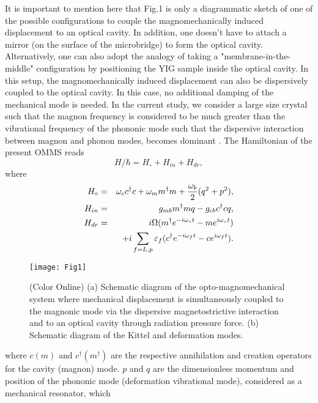 \documentclass[aps,pra,superscriptaddress,balancelastpage,twocolumn]{revtex4}
\begin{document}
It is important to mention here that Fig.1 is only a diagrammatic sketch of one of the possible
configurations to couple the magnomechanically induced displacement to an optical cavity. In addition, one doesn't have to attach a mirror (on the surface of the microbridge) to form the optical cavity. Alternatively, one can also adopt the analogy of taking a "membrane-in-the-middle" configuration by positioning the YIG sample inside the optical cavity. In this setup, the  magnomechanically induced displacement can also be dispersively coupled to the optical cavity. In this case, no additional damping of the mechanical mode is needed. In the current study, we consider a large size crystal such that the magnon frequency is considered to be much greater than the vibrational frequency of the phononic mode such that the dispersive interaction between magnon and phonon modes, becomes dominant \cite{Tang,Ballestero}. The Hamiltonian of the present OMMS reads
\begin{equation}
H/\hbar =H_{\circ }+H_{in}+H_{dr},
\end{equation}%
where
\begin{eqnarray}
H_{\circ } &=&\omega _{c}c^{\dagger }c+\omega _{m}m^{\dagger }m+\frac{\omega
_{b}}{2}(q^{2}+p^{2}), \\
H_{in} &=&g_{mb}m^{\dagger }mq-g_{cb}c^{\dagger }cq,  \label{Hi} \\
H_{dr} &=&i\Omega (m^{\dagger }e^{-i\omega _{\circ }t}-me^{i\omega _{\circ
}t})  \notag \\
&&+i\sum_{f=L,p} \varepsilon _{f}(c^{\dagger }e^{-i\omega _{f}t}-ce^{i\omega
_{f}t}) .
\end{eqnarray}%
\begin{figure}[b!]
\par
\begin{center}
\texttt{[image: Fig1]}
\end{center}
\caption{(Color Online) (a) Schematic diagram of the opto-magnomechanical
system where mechanical displacement is simultaneously coupled to the
magnonic mode via the dispersive magnetostrictive interaction and to an
optical cavity through radiation pressure force. (b) Schematic diagram of
the Kittel and deformation modes.}
\label{A}
\end{figure}
where $c(m)$ and $c^{\dag }\left( m^{\dag }\right) $ are the respective
annihilation and creation operators for the cavity (magnon) mode. $p$ and $q
$ are the dimensionless momentum and position of the phononic mode
(deformation vibrational mode), considered as a mechanical resonator, which
\end{document}
